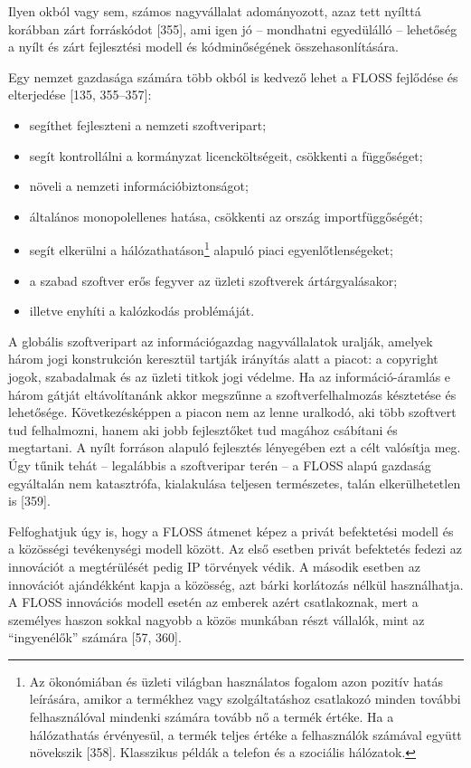 \documentclass[12pt,magyar,a4paper,oneside]{scrreprt}
\providecommand{\tightlist}{%
  \setlength{\itemsep}{0pt}\setlength{\parskip}{0pt}}
\begin{document}
Ilyen okból vagy sem, számos nagyvállalat adományozott, azaz tett
nyílttá korábban zárt forráskódot {[}355{]}, ami igen jó -- mondhatni
egyedülálló -- lehetőség a nyílt és zárt fejlesztési modell és
kódminőségének összehasonlítására.

Egy nemzet gazdasága számára több okból is kedvező lehet a FLOSS
fejlődése és elterjedése {[}135, 355--357{]}:

\begin{itemize}
\tightlist
\item
  segíthet fejleszteni a nemzeti szoftveripart;
\item
  segít kontrollálni a kormányzat licencköltségeit, csökkenti a
  függőséget;
\item
  növeli a nemzeti információbiztonságot;
\item
  általános monopolellenes hatása, csökkenti az ország importfüggőségét;
\item
  segít elkerülni a hálózathatáson\footnote{Az ökonómiában és üzleti
    világban használatos fogalom azon pozitív hatás leírására, amikor a
    termékhez vagy szolgáltatáshoz csatlakozó minden további
    felhasználóval mindenki számára tovább nő a termék értéke. Ha a
    hálózathatás érvényesül, a termék teljes értéke a felhasználók
    számával együtt növekszik {[}358{]}. Klasszikus példák a telefon és
    a szociális hálózatok.} alapuló piaci egyenlőtlenségeket;
\item
  a szabad szoftver erős fegyver az üzleti szoftverek ártárgyalásakor;
\item
  illetve enyhíti a kalózkodás problémáját.
\end{itemize}

A globális szoftveripart az információgazdag nagyvállalatok uralják,
amelyek három jogi konstrukción keresztül tartják irányítás alatt a
piacot: a copyright jogok, szabadalmak és az üzleti titkok jogi védelme.
Ha az információ-áramlás e három gátját eltávolítanánk akkor megszűnne a
szoftverfelhalmozás késztetése és lehetősége. Következésképpen a piacon
nem az lenne uralkodó, aki több szoftvert tud felhalmozni, hanem aki
jobb fejlesztőket tud magához csábítani és megtartani. A nyílt forráson
alapuló fejlesztés lényegében ezt a célt valósítja meg. Úgy tűnik tehát
-- legalábbis a szoftveripar terén -- a FLOSS alapú gazdaság egyáltalán
nem katasztrófa, kialakulása teljesen természetes, talán elkerülhetetlen
is {[}359{]}.

Felfoghatjuk úgy is, hogy a FLOSS átmenet képez a privát befektetési
modell és a közösségi tevékenységi modell között. Az első esetben privát
befektetés fedezi az innovációt a megtérülését pedig IP törvények védik.
A második esetben az innovációt ajándékként kapja a közösség, azt bárki
korlátozás nélkül használhatja. A FLOSS innovációs modell esetén az
emberek azért csatlakoznak, mert a személyes haszon sokkal nagyobb a
közös munkában részt vállalók, mint az ``ingyenélők'' számára {[}57,
360{]}.
\end{document}
